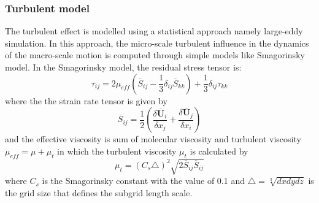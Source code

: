 \documentclass[preprint,12pt]{elsarticle}
\begin{document}
\subsubsection{Turbulent model}
The turbulent effect is modelled using a statistical approach namely large-eddy simulation. In this approach, the micro-scale turbulent influence in the dynamics of the macro-scale motion is computed through simple models like Smagorinsky model. In the Smagorinsky model, the residual stress tensor is:
%
\begin{equation}
     \tau_{ij} = 2 \mu_{eff} (\overline{S}_{ij} - \frac{1}{3} \delta_{ij} \overline{S}_{kk}) + \frac{1}{3} \delta_{ij} \tau_{kk}
\end {equation}
%
%
where the the strain rate tensor is given by
%
\begin{equation}
     \overline{S}_{ij} = \frac{1}{2} (\frac{\delta \overline{\pmb{U}}_i}{\delta x_j} + \frac{\delta \overline{\pmb{U}}_j}{\delta x_i})
\end {equation}
%
%
and the effective viscosity is sum of molecular viscosity and turbulent viscosity $\mu_{eff} = \mu + \mu_t$ in which the turbulent viscosity $\mu_t$ is calculated by
%
\begin{equation}
    \mu_t = (C_s \triangle)^2 \sqrt{2 \overline{S}_{ij} \overline{S}_{ij}}
\end {equation}
%
%
where $C_s$ is the Smagorinsky constant with the value of 0.1 and $\triangle = \sqrt[3]{dx dy dz}$ is the grid size that defines the subgrid length scale.
\end{document}
